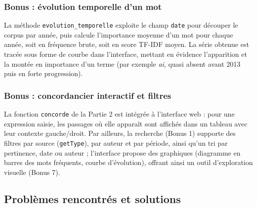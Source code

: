 \documentclass[12pt,a4paper]{article}
\begin{document}
\subsubsection{Bonus : évolution temporelle d'un mot}
La méthode \texttt{evolution\_temporelle} exploite le champ \texttt{date} pour découper le corpus par année, puis calcule l'importance moyenne d'un mot pour chaque année, soit en fréquence brute, soit en score TF-IDF moyen. La série obtenue est tracée sous forme de courbe dans l'interface, mettant en évidence l'apparition et la montée en importance d'un terme (par exemple \emph{ai}, quasi absent avant 2013 puis en forte progression).

\subsubsection{Bonus : concordancier interactif et filtres}
La fonction \texttt{concorde} de la Partie 2 est intégrée à l'interface web : pour une expression saisie, les passages où elle apparaît sont affichés dans un tableau avec leur contexte gauche/droit. Par ailleurs, la recherche (Bonus 1) supporte des filtres par source (\texttt{getType}), par auteur et par période, ainsi qu'un tri par pertinence, date ou auteur ; l'interface propose des graphiques (diagramme en barres des mots fréquents, courbe d'évolution), offrant ainsi un outil d'exploration visuelle (Bonus 7).

\subsection{Problèmes rencontrés et solutions}
\end{document}
